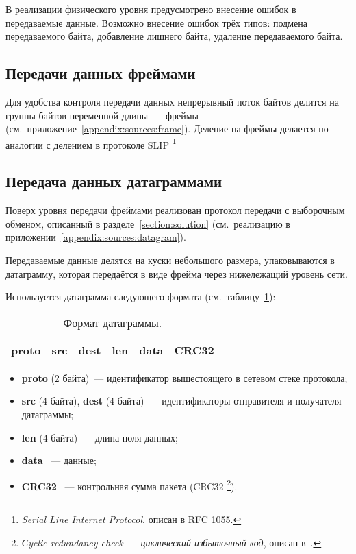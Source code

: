 \documentclass[a4paper,10pt]{article}
\begin{document}
В реализации физического уровня предусмотрено внесение ошибок в передаваемые данные.
Возможно внесение ошибок трёх типов: подмена передаваемого байта, 
добавление лишнего байта, удаление передаваемого байта.

\subsection{Передачи данных фреймами}
Для удобства контроля передачи данных 
непрерывный поток байтов делится на группы байтов переменной длины~--- фреймы
(см.~приложение~\ref{appendix:sources:frame}).
Деление на фреймы делается по аналогии с делением в протоколе SLIP%
\footnote{\textit{Serial Line Internet Protocol}, описан в RFC 1055.}

\subsection{Передача данных датаграммами}
Поверх уровня передачи фреймами реализован протокол передачи с выборочным обменом,
описанный в разделе~\ref{section:solution} 
(см.~реализацию в приложении~\ref{appendix:sources:datagram}).

Передаваемые данные делятся на куски небольшого размера, 
упаковываются в датаграмму,
которая передаётся в виде фрейма через нижележащий уровень сети.

Используется датаграмма следующего формата (см.~таблицу~\ref{table:datagram}):
\begin{table}[h]
  \begin{center}
    \begin{tabular}{|c|c|c|c|c|c|}
      \hline
      proto & src & dest & len & data & CRC32 \\
      \hline
    \end{tabular}
  \end{center}
  \caption{Формат датаграммы.}
  \label{table:datagram}
\end{table}
\begin{itemize}
  \item \textbf{proto} (2 байта)~--- 
  идентификатор вышестоящего в сетевом стеке протокола;
  \item \textbf{src} (4 байта), \textbf{dest} (4 байта)~--- 
  идентификаторы отправителя и получателя датаграммы;
  \item \textbf{len} (4 байта)~--- длина поля данных;
  \item \textbf{data} ~--- данные;
  \item \textbf{CRC32} ~--- контрольная сумма пакета (CRC32%
\footnote{\textit{Сyclic redundancy check}~--- \textit{циклический избыточный код}, %
описан в~\cite{peterson1961crc}.%
}).
\end{itemize}
\end{document}
